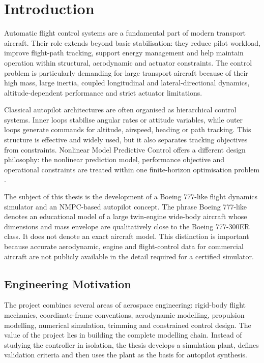 \chapter{Introduction}

Automatic flight control systems are a fundamental part of modern transport aircraft. Their role extends beyond basic stabilisation: they reduce pilot workload, improve flight-path tracking, support energy management and help maintain operation within structural, aerodynamic and actuator constraints. The control problem is particularly demanding for large transport aircraft because of their high mass, large inertia, coupled longitudinal and lateral-directional dynamics, altitude-dependent performance and strict actuator limitations.

Classical autopilot architectures are often organised as hierarchical control systems. Inner loops stabilise angular rates or attitude variables, while outer loops generate commands for altitude, airspeed, heading or path tracking. This structure is effective and widely used, but it also separates tracking objectives from constraints. Nonlinear Model Predictive Control offers a different design philosophy: the nonlinear prediction model, performance objective and operational constraints are treated within one finite-horizon optimisation problem \cite{rawlings2017mpc,grune2017nmpc}.

The subject of this thesis is the development of a Boeing 777-like flight dynamics simulator and an NMPC-based autopilot concept. The phrase Boeing 777-like denotes an educational model of a large twin-engine wide-body aircraft whose dimensions and mass envelope are qualitatively close to the Boeing 777-300ER class. It does not denote an exact aircraft model. This distinction is important because accurate aerodynamic, engine and flight-control data for commercial aircraft are not publicly available in the detail required for a certified simulator.

\section{Engineering Motivation}

The project combines several areas of aerospace engineering: rigid-body flight mechanics, coordinate-frame conventions, aerodynamic modelling, propulsion modelling, numerical simulation, trimming and constrained control design. The value of the project lies in building the complete modelling chain. Instead of studying the controller in isolation, the thesis develops a simulation plant, defines validation criteria and then uses the plant as the basis for autopilot synthesis.

